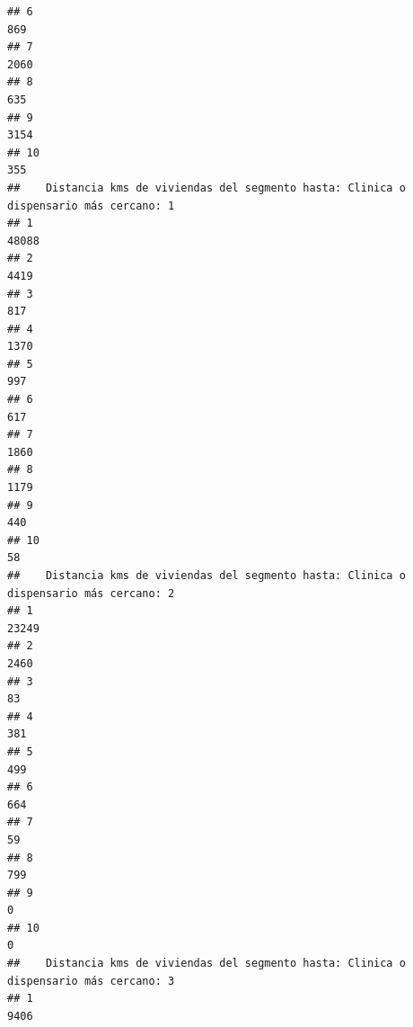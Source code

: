 \documentclass[11pt,]{article}
\begin{document}
\begin{verbatim}
## 6                                                                                  869
## 7                                                                                 2060
## 8                                                                                  635
## 9                                                                                 3154
## 10                                                                                 355
##    Distancia kms de viviendas del segmento hasta: Clinica o dispensario más cercano: 1
## 1                                                                                48088
## 2                                                                                 4419
## 3                                                                                  817
## 4                                                                                 1370
## 5                                                                                  997
## 6                                                                                  617
## 7                                                                                 1860
## 8                                                                                 1179
## 9                                                                                  440
## 10                                                                                  58
##    Distancia kms de viviendas del segmento hasta: Clinica o dispensario más cercano: 2
## 1                                                                                23249
## 2                                                                                 2460
## 3                                                                                   83
## 4                                                                                  381
## 5                                                                                  499
## 6                                                                                  664
## 7                                                                                   59
## 8                                                                                  799
## 9                                                                                    0
## 10                                                                                   0
##    Distancia kms de viviendas del segmento hasta: Clinica o dispensario más cercano: 3
## 1                                                                                 9406

\end{verbatim}
\end{document}
